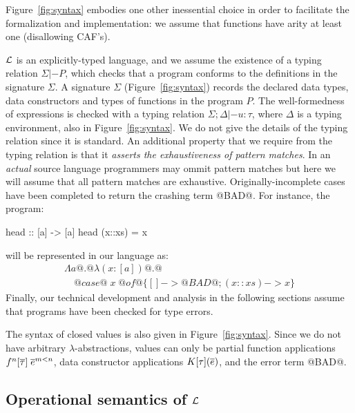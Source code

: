 Figure~\ref{fig:syntax} embodies one other inessential choice in order to 
facilitate the formalization and implementation: we assume that 
functions have arity at least one (disallowing CAF's).   

$\cal L$ is an explicitly-typed language, and we assume the 
existence of a typing relation $\Sigma |- P$, which checks 
that a program conforms to the definitions in the signature $\Sigma$. A signature $\Sigma$ (Figure~\ref{fig:syntax})
records the declared data types, data constructors and types of functions in the program $P$. The 
well-formedness of expressions is checked with a typing relation $\Sigma;\Delta |- u : \tau$, where $\Delta$
is a typing environment, also in Figure~\ref{fig:syntax}.
We do not give the details of the typing relation since it is standard. An additional property that we require 
from the typing relation is that it {\em asserts the exhaustiveness of pattern matches}. In an {\em actual}
source language programmers may ommit pattern matches but here we will assume that all pattern matches 
are exhaustive. Originally-incomplete cases have been completed to return the crashing term @BAD@. For 
instance, the program:
\begin{code}
head :: [a] -> [a]
head (x::xs) = x
\end{code}
will be represented in our language as:
\[\begin{array}{l}
   \Lambda a @.@ \lambda (x{:}[a]) @.@ \\
   \quad @case@\;x\;@of@ \{ [] -> @BAD@ ; (x::xs) -> x \} 
\end{array}\]
Finally, our technical development and analysis in the following sections assume that programs have been 
checked for type errors. 

The syntax of closed values is also given in Figure~\ref{fig:syntax}. Since we do not 
have arbitrary $\lambda$-abstractions, values can only be partial function applications
$f^n[\overline{\tau}]\;\overline{e}^{m < n}$, data constructor applications $K[\tau](\overline{e})$, 
and the error term @BAD@. 

\subsection{Operational semantics of $\cal L$}

